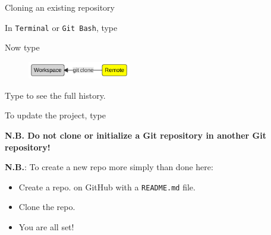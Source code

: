 \documentclass[10pt]{beamer}
\begin{document}
\begin{frame}[fragile]{Cloning an existing repository}
\protect\hypertarget{cloning-an-existing-repository}{}

In \texttt{Terminal} or \texttt{Git\ Bash}, type 

Now type 

\begin{figure}[H]

{\centering \includegraphics[width=0.4\textwidth]{mermaid/mermaid-figure-10.png}

}

\end{figure}

Type  to see the full history.

To update the project, type 

\textbf{N.B. Do not clone or initialize a Git repository in another Git
repository!}

\textbf{N.B.}: To create a new repo more simply than done here:
\begin{itemize}
  \item Create a repo. on GitHub with a \texttt{README.md} file.
  \item Clone the repo.
  \item You are all set!
\end{itemize}

\end{frame}
\end{document}
